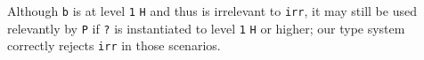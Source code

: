 \documentclass[acmsmall, screen=true, nonacm=true,
  review=\ifpublic false\else true\fi,
  anonymous=\ifanonymous true\else false\fi
]{acmart}
\providecommand{\DIFaddbegin}{} %
\providecommand{\DIFaddend}{} %
\providecommand{\DIFdelbegin}{} %
\providecommand{\DIFdelend}{} %
\begin{document}
Although \lstinline{b} is at level \DIFdelbegin %
{\color{red}%
\lstinline{1} %
}%
\DIFdelend \DIFaddbegin {\color{blue}%
\lstinline{H} %
}%
\DIFaddend and thus
is irrelevant to \lstinline{irr}, it may still be used relevantly by
\lstinline{P} if \lstinline{?} is instantiated to level \DIFdelbegin %
{\color{red}%
\lstinline{1} %
}%
\DIFdelend \DIFaddbegin {\color{blue}%
\lstinline{H} %
}%
\DIFaddend or
higher; our type system correctly rejects \lstinline{irr}
in those scenarios.






\end{document}
